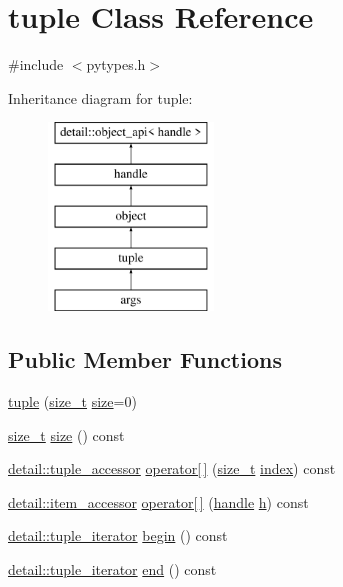 \hypertarget{classtuple}{}\section{tuple Class Reference}
\label{classtuple}


{\ttfamily \#include $<$pytypes.\+h$>$}

Inheritance diagram for tuple\+:\begin{figure}[H]
\begin{center}
\leavevmode
\includegraphics[height=5.000000cm]{classtuple}
\end{center}
\end{figure}
\subsection*{Public Member Functions}
\begin{DoxyCompactItemize}
\item 
\mbox{\hyperlink{classtuple_a627c178ecad64dd6795906d91c844ed8}{tuple}} (\mbox{\hyperlink{detail_2common_8h_a801d6a451a01953ef8cbae6feb6a3638}{size\+\_\+t}} \mbox{\hyperlink{_s_d_l__opengl__glext_8h_a3d1e3edfcf61ca2d831883e1afbad89e}{size}}=0)
\item 
\mbox{\hyperlink{detail_2common_8h_a801d6a451a01953ef8cbae6feb6a3638}{size\+\_\+t}} \mbox{\hyperlink{classtuple_ab962c5f22da58f5d94f2107bec093f81}{size}} () const
\item 
\mbox{\hyperlink{pytypes_8h_a2345c1cb65083637589e00a50f7b3876}{detail\+::tuple\+\_\+accessor}} \mbox{\hyperlink{classtuple_aae04fa4cd62a8cb8834f4ce50a276688}{operator\mbox{[}$\,$\mbox{]}}} (\mbox{\hyperlink{detail_2common_8h_a801d6a451a01953ef8cbae6feb6a3638}{size\+\_\+t}} \mbox{\hyperlink{_s_d_l__opengl__glext_8h_a57f14e05b1900f16a2da82ade47d0c6d}{index}}) const
\item 
\mbox{\hyperlink{pytypes_8h_a9907d3edf962653e33d36bccc8b8a268}{detail\+::item\+\_\+accessor}} \mbox{\hyperlink{classtuple_a1a491611659e1556fa4ece44b495e9a0}{operator\mbox{[}$\,$\mbox{]}}} (\mbox{\hyperlink{classhandle}{handle}} \mbox{\hyperlink{_s_d_l__opengl__glext_8h_afa0fb1b5e976920c0abeff2dca3ed774}{h}}) const
\item 
\mbox{\hyperlink{pytypes_8h_ab687138c20cfdae7f2935d4fe93cb83a}{detail\+::tuple\+\_\+iterator}} \mbox{\hyperlink{classtuple_a4f9fdd4818d98a30ebd5001c69409902}{begin}} () const
\item 
\mbox{\hyperlink{pytypes_8h_ab687138c20cfdae7f2935d4fe93cb83a}{detail\+::tuple\+\_\+iterator}} \mbox{\hyperlink{classtuple_ae02904f7b808223cb2922e9c6f7a67b3}{end}} () const
\end{DoxyCompactItemize}
